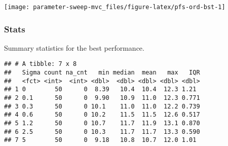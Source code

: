 \documentclass[]{book}
\newenvironment{Shaded}{\begin{snugshade}}{\end{snugshade}}
\newcommand{\DataTypeTok}[1]{\textcolor[rgb]{0.13,0.29,0.53}{#1}}
\newcommand{\KeywordTok}[1]{\textcolor[rgb]{0.13,0.29,0.53}{\textbf{#1}}}
\newcommand{\NormalTok}[1]{#1}
\newcommand{\OperatorTok}[1]{\textcolor[rgb]{0.81,0.36,0.00}{\textbf{#1}}}
\newcommand{\OtherTok}[1]{\textcolor[rgb]{0.56,0.35,0.01}{#1}}
\newcommand{\StringTok}[1]{\textcolor[rgb]{0.31,0.60,0.02}{#1}}
\begin{document}
\texttt{[image: parameter-sweep-mvc\_files/figure-latex/pfs-ord-bst-1]}

\hypertarget{stats-32}{%
\subsubsection{Stats}\label{stats-32}}

Summary statistics for the best performance.

\begin{Shaded}
\end{Shaded}

\begin{verbatim}
## # A tibble: 7 x 8
##   Sigma count na_cnt   min median  mean   max   IQR
##   <fct> <int>  <int> <dbl>  <dbl> <dbl> <dbl> <dbl>
## 1 0        50      0  8.39   10.4  10.4  12.3 1.21 
## 2 0.1      50      0  9.90   10.9  11.0  12.3 0.771
## 3 0.3      50      0 10.1    11.0  11.0  12.2 0.739
## 4 0.6      50      0 10.2    11.5  11.5  12.6 0.517
## 5 1.2      50      0 10.7    11.7  11.9  13.1 0.870
## 6 2.5      50      0 10.3    11.7  11.7  13.3 0.590
## 7 5        50      0  9.18   10.8  10.7  12.0 1.01
\end{verbatim}
\end{document}
